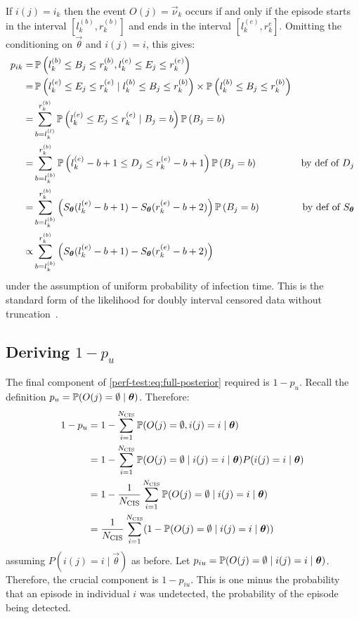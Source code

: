 \documentclass[thesis.tex]{subfiles}
\begin{document}
If $i(j) = i_k$ then the event $O(j) = \vec{\nu}_k$ occurs if and only if the episode starts in the interval $[l^{(b)}_k, r^{(b)}_k]$ and ends in the interval $[l^{(e)}_k, r^{e}_k]$.
Omitting the conditioning on $\vec{\theta}$ and $i(j) = i$, this gives:
\begin{align}
p_{ik}
=& \operatorname{\mathbb{P}} \left( l_k^{(b)} \leq B_{j} \leq r_k^{(b)}, l_k^{(e)} \leq E_{j} \leq r_k^{(e)} \right) \\
=& \operatorname{\mathbb{P}} \left( l_k^{(e)} \leq E_{j} \leq r_k^{(e)} \mid l_k^{(b)} \leq B_{j} \leq r_k^{(b)} \right) \times\operatorname{\mathbb{P}} \left( l_k^{(b)} \leq B_{j} \leq r_k^{(b)} \right) \\
=& \sum_{b = l_k^{(l)}}^{r_k^{(b)}} \operatorname{\mathbb{P}} \left( l_k^{(e)} \leq E_{j} \leq r_k^{(e)} \mid B_{j} = b \right) \operatorname{\mathbb{P}} \left(B_{j} = b \right) \\
=& \sum_{b = l_k^{(b)}}^{r_k^{(b)}} \operatorname{\mathbb{P}} \left( l_k^{(e)} - b + 1 \leq D_{j} \leq r_k^{(e)} - b + 1 \right) \operatorname{\mathbb{P}} \left(B_{j} = b \right) &\text{by def of $D_{j}$} \\
=& \sum_{b = l_k^{(b)}}^{r_k^{(b)}} \left( S_{\bm{\theta}}(l_k^{(e)} - b + 1) - S_{\bm{\theta}}(r_k^{(e)} - b + 2) \right) \operatorname{\mathbb{P}} \left(B_{j} = b \right) &\text{by def of $S_{\bm{\theta}}$} \\
\propto& \sum_{b = l_k^{(b)}}^{r_k^{(b)}} \left( S_{\bm{\theta}}(l_k^{(e)} - b + 1) - S_{\bm{\theta}}(r_k^{(e)} - b + 2) \right)
\label{perf-test:eq:pia}
\end{align}
under the assumption of uniform probability of infection time.
This is the standard form of the likelihood for doubly interval censored data without truncation~\autocite[e.g.][]{sunEmpirical}.

\subsection{Deriving $1 - p_u$} \label{perf-test:sec:prob-undetected}

The final component of \cref{perf-test:eq:full-posterior} required is $1 - p_u$.
Recall the definition $p_u = \operatorname{\mathbb{P}}(O(j) = \emptyset \mid \bm{\theta})$.
Therefore:
\begin{align}
  1 - p_u
  &= 1 - \sum_{i=1}^{N_\text{CIS}} \operatorname{\mathbb{P}}(O(j) = \emptyset, i(j) = i \mid \bm{\theta}) \\
  &= 1 - \sum_{i=1}^{N_\text{CIS}} \operatorname{\mathbb{P}}(O(j) = \emptyset \mid i(j) = i \mid \bm{\theta}) P(i(j) = i \mid \bm{\theta}) \\
  &= 1 - \frac{1}{N_\text{CIS}}\sum_{i=1}^{N_\text{CIS}} \operatorname{\mathbb{P}}(O(j) = \emptyset \mid i(j) = i \mid \bm{\theta}) \\
  &= \frac{1}{N_\text{CIS}} \sum_{i=1}^{N_\text{CIS}} (1 - \operatorname{\mathbb{P}}(O(j) = \emptyset \mid i(j) = i \mid \bm{\theta}))
  \label{perf-test:eq:pu}
\end{align}
assuming $P(i(j) = i \mid \vec{\theta})$ as before.
Let $p_{iu} = \operatorname{\mathbb{P}}(O(j) = \emptyset \mid i(j) = i \mid \bm{\theta})$.
Therefore, the crucial component is $1 - p_{iu}$.
This is one minus the probability that an episode in individual $i$ was undetected, \ie the probability of the episode being detected.
\end{document}

